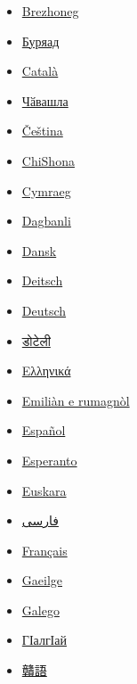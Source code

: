 \documentclass[11pt,a4paper]{article}
\begin{document}
\begin{itemize}
\item \href{https://br.wikipedia.org/wiki/Houad\_\%28evn\%29}{Brezhoneg}
\item \href{https://bxr.wikipedia.org/wiki/\%D0\%9D\%D1\%83\%D0\%B3\%D0\%B0h\%D0\%B0\%D0\%BD}{Буряад}
\item \href{https://ca.wikipedia.org/wiki/\%C3\%80necs}{Català}
\item \href{https://cv.wikipedia.org/wiki/\%D0\%9A\%C4\%83\%D0\%B2\%D0\%B0\%D0\%BA\%D0\%B0\%D0\%BB\%D1\%81\%D0\%B5\%D0\%BC}{Чӑвашла}
\item \href{https://cs.wikipedia.org/wiki/Kachna}{Čeština}
\item \href{https://sn.wikipedia.org/wiki/Dhadha}{ChiShona}
\item \href{https://cy.wikipedia.org/wiki/Hwyaden}{Cymraeg}
\item \href{https://dag.wikipedia.org/wiki/Gbunya\%C9\%A3u}{Dagbanli}
\item \href{https://da.wikipedia.org/wiki/\%C3\%86nder}{Dansk}
\item \href{https://pdc.wikipedia.org/wiki/Ent}{Deitsch}
\item \href{https://de.wikipedia.org/wiki/Enten}{Deutsch}
\item \href{https://dty.wikipedia.org/wiki/\%E0\%A4\%B9\%E0\%A4\%BE\%E0\%A4\%81\%E0\%A4\%B8}{डोटेली}
\item \href{https://el.wikipedia.org/wiki/\%CE\%A0\%CE\%AC\%CF\%80\%CE\%B9\%CE\%B1}{Ελληνικά}
\item \href{https://eml.wikipedia.org/wiki/An\%C3\%A0dra}{Emiliàn e rumagnòl}
\item \href{https://es.wikipedia.org/wiki/Pato}{Español}
\item \href{https://eo.wikipedia.org/wiki/Anaso}{Esperanto}
\item \href{https://eu.wikipedia.org/wiki/Ahate}{Euskara}
\item \href{https://fa.wikipedia.org/wiki/\%D9\%85\%D8\%B1\%D8\%BA\%D8\%A7\%D8\%A8\%DB\%8C}{فارسی}
\item \href{https://fr.wikipedia.org/wiki/Canard}{Français}
\item \href{https://ga.wikipedia.org/wiki/Lacha}{Gaeilge}
\item \href{https://gl.wikipedia.org/wiki/Pato}{Galego}
\item \href{https://inh.wikipedia.org/wiki/\%D0\%91\%D0\%BE\%D0\%B0\%D0\%B1\%D0\%B0\%D1\%88\%D0\%BA\%D0\%B0\%D1\%88}{ГӀалгӀай}
\item \href{https://gan.wikipedia.org/wiki/\%E9\%B4\%A8}{贛語}

\end{itemize}
\end{document}
